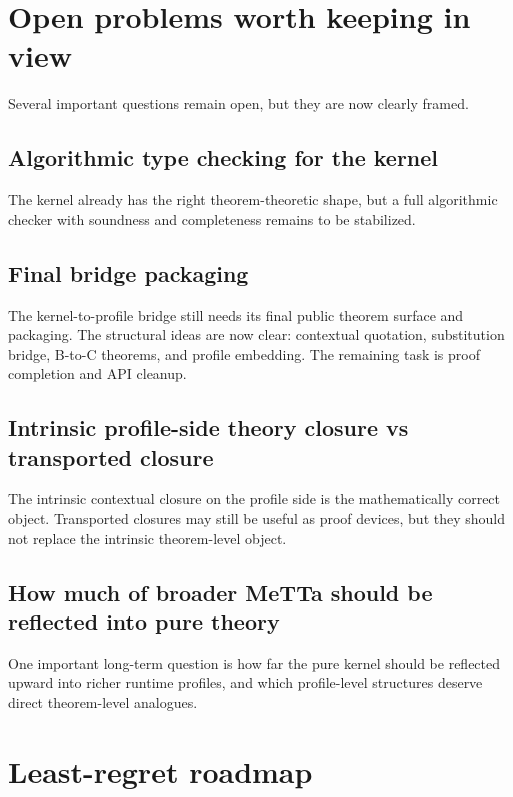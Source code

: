 \documentclass[11pt]{article}
\begin{document}
\section{Open problems worth keeping in view}

Several important questions remain open, but they are now clearly framed.

\subsection{Algorithmic type checking for the kernel}

The kernel already has the right theorem-theoretic shape, but a full algorithmic checker with soundness and completeness remains to be stabilized.

\subsection{Final bridge packaging}

The kernel-to-profile bridge still needs its final public theorem surface and packaging. The structural ideas are now clear: contextual quotation, substitution bridge, B-to-C theorems, and profile embedding. The remaining task is proof completion and API cleanup.

\subsection{Intrinsic profile-side theory closure vs transported closure}

The intrinsic contextual closure on the profile side is the mathematically correct object. Transported closures may still be useful as proof devices, but they should not replace the intrinsic theorem-level object.

\subsection{How much of broader MeTTa should be reflected into pure theory}

One important long-term question is how far the pure kernel should be reflected upward into richer runtime profiles, and which profile-level structures deserve direct theorem-level analogues.

\section{Least-regret roadmap}
\end{document}
